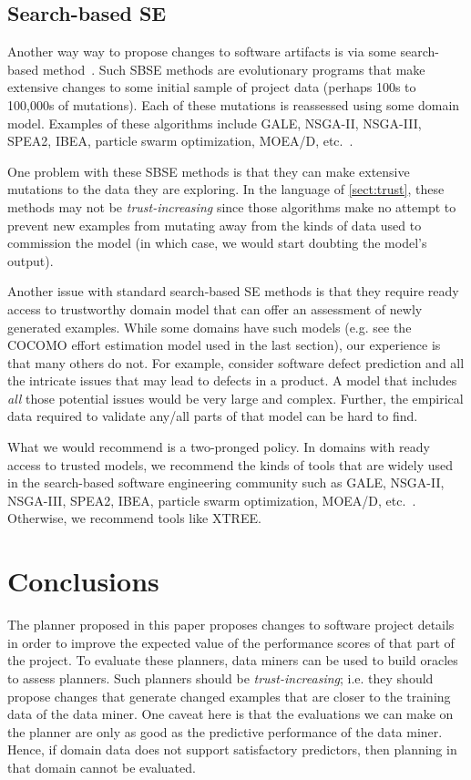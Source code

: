 \documentclass{sig-alternate}
\newcommand{\tion}[1]{\textsection\ref{sect:#1}}
\begin{document}
\subsection{Search-based SE}

Another way way to propose changes to software artifacts
is   via some search-based method~\cite{Harman2009,Harman2011}. Such SBSE methods are   evolutionary programs that 
make
 extensive changes to  some initial sample of project data
 (perhaps 
100s to 100,000s of mutations). Each of these mutations
is reassessed using some domain model.
Examples of these algorithms include GALE, NSGA-II, NSGA-III, SPEA2, IBEA, particle swarm optimization, MOEA/D, etc.~\cite{krall14,deb00a,zit02,zit04,%
deb14,Cui2005a,zhang07:TEC}.

One problem with these   SBSE methods is that they can  make extensive mutations to the data they are exploring. In the language
of \tion{trust}, these methods may not be {\em trust-increasing} since those algorithms make no attempt
to prevent new examples from mutating away from the kinds of data used to commission the model (in which case, we would
start doubting the model's output).

Another issue with standard search-based SE methods is that they require ready access to 
trustworthy domain model that can offer an assessment
of newly generated examples. While some domains have such models (e.g. see the COCOMO effort estimation model
used in the last section), our experience is that many others do not.  For example, 
consider software defect prediction and all the intricate issues that may lead to defects in a product. A model that includes {\em all} those
potential issues would be very large and complex. Further,
the empirical data required to validate any/all parts
of that model can be hard to find.

What we would recommend is a two-pronged policy.
In domains with ready access to trusted models, we recommend
the kinds of tools that are widely used in the search-based
software engineering community such as GALE, NSGA-II, NSGA-III, SPEA2, IBEA, particle swarm optimization, MOEA/D, etc.~\cite{krall14,deb00a,zit02,zit04,%
deb14,Cui2005a,zhang07:TEC}. Otherwise, we recommend tools like XTREE.

\section{Conclusions}

The planner proposed in this paper proposes changes to software project details in order to improve the expected
value of the performance scores of that part of the project.
To evaluate these planners,
data miners can be used to build oracles to assess planners.
Such planners should be {\em trust-increasing}; i.e. they should propose changes that generate
changed examples that are closer to the training data of the data miner.
One caveat here is that the evaluations we can make on the planner are only as good as the predictive
performance of the data miner. Hence, if domain data does not support satisfactory predictors, then
planning in that domain cannot be evaluated.
\end{document}
